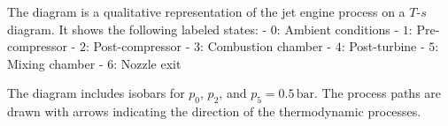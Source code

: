The diagram is a qualitative representation of the jet engine process on a \( T \)-\( s \) diagram. It shows the following labeled states:  
- \( 0 \): Ambient conditions  
- \( 1 \): Pre-compressor  
- \( 2 \): Post-compressor  
- \( 3 \): Combustion chamber  
- \( 4 \): Post-turbine  
- \( 5 \): Mixing chamber  
- \( 6 \): Nozzle exit  

The diagram includes isobars for \( p_0 \), \( p_2 \), and \( p_5 = 0.5 \, \text{bar} \). The process paths are drawn with arrows indicating the direction of the thermodynamic processes.